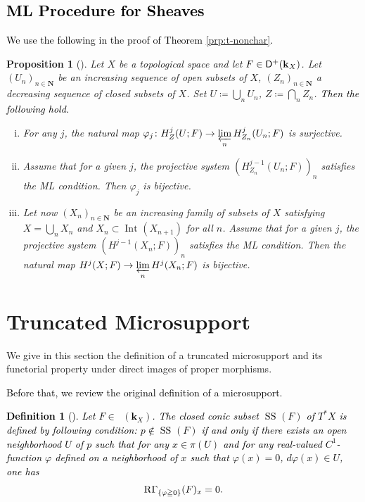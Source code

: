 ﻿\documentclass[a4paper,leqno,dvipdfmx]{jsarticle}
\newtheorem{Definition+}[Axiom+]{Definition}
\newtheorem{Proposition+}[Axiom+]{Proposition}
\theoremstyle{definition}
\newcommand{\nn}{\mathbf{N}}
\newcommand{\kk}{\mathbf{k}}
\numberwithin{equation}{section}
\newcommand{\Dompl}{\mathop{\mathsf{D}^\mathrm{+}}\nolimits}
\newcommand{\Dompb}{\mathop{\mathsf{D}^\mathrm{b}}\nolimits}
\newcommand{\muS}[1][]{\mathop{\mathrm{SS}}\nolimits_{#1}}
\newcommand{\RG}{\mathop{\mathrm{R}\hspace{-0pt}\Gamma}\nolimits}
\newcommand{\prolim}[1][]{\mathop{\varprojlim}\limits_{#1}}
\theoremstyle{mystyle}
\newcommand{\Int}[1][]{\mathop{\mathrm{Int}}\nolimits_{#1}}
\newcommand{\cotb}[1][]{T^{\ast}{#1}}
\begin{document}
\subsection{\textcolor{black}{ML Procedure for Sheaves}}

\textcolor{black}{We use the following 
in the proof of Theorem \ref{prp:t-nonchar}.}

\begin{Proposition+}[{\cite[Proposition 2.7.1]{KS90}}]\label{prop:ks2.7.1}
  Let \(X\) be a topological space and let \(F\in\Dompl(\textcolor{black}{\kk}_X)\). 
  Let \(\left(U_n\right)_{n\in\nn}\) be an increasing sequence 
  of open subsets of \(X\), \(\left(Z_n\right)_{n\in\nn}\) 
  a decreasing sequence of closed subsets of \(X\). 
  Set \(U\coloneqq\bigcup_{n}U_{n}\), 
  \(Z\coloneqq\bigcap_{n}Z_{n}\). 
  \textcolor{black}{Then the following hold.}
  \begin{enumerate}[(i)]
    \item \label{item:ks2.7.1.1} For any \(j\), the natural map \(
      \varphi_j\colon H^{j}_{Z}(U;F)
      \to 
      \prolim[n]H^{j}_{Z_{n}}(U_{n};F)
    \) is surjective. 
    \item \label{item:ks2.7.1.2} Assume that for a given \(j\), 
    the projective system \(
      (H^{j-1}_{Z_{n}}(U_{n};F))_{n}
    \) satisfies the ML condition. 
    Then \(\varphi_{j}\) is bijective. 
    \item \label{item:ks2.7.1.3} Let now \(\left(X_{n}\right)_{n\in\nn}\) be 
    an increasing family of subsets of \(X\) satisfying \(
      X=\bigcup_{n}X_n\) and \(X_{n}\subset \Int[](X_{n+1})
    \) for all \(n\). 
    Assume that for a given \(j\), the projective system \(
      \left(H^{j-1}(X_{n};F)\right)_{n}
    \) satisfies the ML condition. 
    Then the natural map \(
      H^{j}(X;F)\to \prolim[n]H^{j}(X_{n};F)
    \) is bijective. 
  \end{enumerate}
\end{Proposition+}

\section{Truncated Microsupport}\label{sec:t-ss}

We give in this section 
the definition of a truncated microsupport 
and 
its functorial property under direct images of proper morphisms. 
\textcolor{black}{Before that, 
we review the original definition of a microsupport. 
\begin{Definition+}[{\cite[Definition 5.1.2]{KS90}}]
  Let \(F\in\Dompb(\kk_X)\). 
  The closed conic subset \(\muS[](F)\) of \(\cotb[X]\) 
  is defined by following condition: \(p\notin \muS[](F)\) 
  if and only if 
  there exists an open neighborhood \(U\) of \(p\) 
  such that for any \(x\in \pi(U)\) and 
  for any real-valued \(C^{1}\)-function \(\varphi\) 
  defined on a neighborhood of \(x\) such that 
  \(\varphi(x)=0\), \(d\varphi(x)\in U\), 
  one has \begin{equation}
    \RG_{\{\varphi\geqq0\}}(F)_x=0.
  \end{equation}
\end{Definition+}
}
\end{document}
